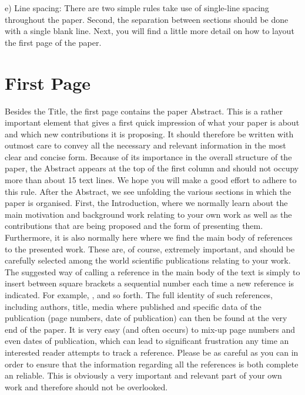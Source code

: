 \documentclass{IEEEconfA4}
\begin{document}
\noindent e)	Line spacing: There are two simple rules take use of single-line spacing throughout the paper. Second, the separation between sections should be done with a single blank line.
Next, you will find a little more detail on how to layout the first page of the paper.


\section{First Page}

Besides the Title, the first page contains the paper Abstract. This is a rather important element that gives a first quick impression of what your paper is about and which new contributions it is proposing. It should therefore be written with outmost care to convey all the necessary and relevant information in the most clear and concise form. Because of its importance in the overall structure of the paper, the Abstract appears at the top of the first column and should not occupy more than about 15 text lines.  We hope you will make a good effort to adhere to this rule.
After the Abstract, we see unfolding the various sections in which the paper is organised. First, the Introduction, where we normally learn about the main motivation and background work relating to your own work as well as the contributions that are being proposed and the form of presenting them. Furthermore, it is also normally here where we find the main body of references to the presented work. These are, of course, extremely important, and should be carefully selected among the world scientific publications relating to your work. The suggested way of calling a reference in the main body of the text is simply to insert between square brackets a sequential number each time a new reference is indicated. For example, \cite{Garcia2005,Franca2006}, and so forth. The full identity of such references, including authors, title, media where published and specific data of the publication (page numbers, date of publication) can then be found at the very end of the paper. It is very easy (and often occurs) to mix-up page numbers and even dates of publication, which can lead to significant frustration any time an interested reader attempts to track a reference. Please be as careful as you can in order to ensure that the information regarding all the references is both complete an reliable. This is obviously a very important and relevant part of your own work and therefore should not be overlooked.
\end{document}
